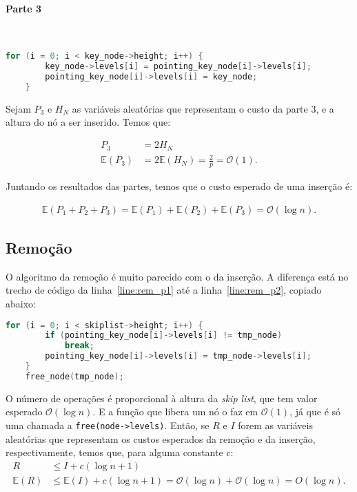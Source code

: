 \documentclass[paper=a4, fontsize=11pt]{scrartcl} %
\numberwithin{equation}{section}
\numberwithin{figure}{section}
\numberwithin{table}{section}
\numberwithin{definition}{section}
\numberwithin{theorem}{section}
\numberwithin{property}{section}
\numberwithin{proposition}{section}
\newcommand{\cO}{\ensuremath{\mathcal{O}}}
\renewcommand{\sl}{\textit{skip list}\xspace}
\newcommand{\Exp}{\ensuremath{{\mathbb{E}}}\xspace}
\begin{document}
\paragraph{Parte 3}
\ \\

\begin{lstlisting}[caption=Inserção Parte 3., language=C]
    for (i = 0; i < key_node->height; i++) {                     
        key_node->levels[i] = pointing_key_node[i]->levels[i];
        pointing_key_node[i]->levels[i] = key_node;
    }                                                           
\end{lstlisting}

Sejam $P_3$ e $H_N$ as variáveis aleatórias que representam o custo da parte 3, e a altura do nó a ser
inserido. Temos que:

\begin{align*}
P_3 &= 2 H_N \\
\Exp(P_3) &= 2 \Exp(H_N) = \frac{2}{p} = \cO(1).
\end{align*}


Juntando os resultados das partes, temos que o custo esperado de uma inserção é:

\begin{align*}
\Exp(P_1 + P_2 + P_3) = \Exp(P_1) + \Exp(P_2) + \Exp(P_3) = \cO(\log n).
\end{align*}


\subsection{Remoção}

O algoritmo da remoção é muito parecido com o da inserção. A diferença está no trecho de código da linha~\ref{line:rem_p1}
até a linha~\ref{line:rem_p2}, copiado abaixo:
\begin{lstlisting}[caption=Parte exclusiva da Remoção, language=C]
    for (i = 0; i < skiplist->height; i++) {
        if (pointing_key_node[i]->levels[i] != tmp_node)
            break;
        pointing_key_node[i]->levels[i] = tmp_node->levels[i];
    }
    free_node(tmp_node);
\end{lstlisting}

O número de operações é proporcional à altura da \sl, que tem valor esperado $\cO(\log n)$. E a função 
que libera um nó o faz em $\cO(1)$, já que é só uma chamada a \verb|free(node->levels)|. Então, se $R$ e $I$ forem
as variáveis aleatórias que representam os custos esperados da remoção e da inserção, respectivamente, temos que,
para alguma constante $c$:
\begin{align*}
R &\leq I + c( \log n + 1) \\
\Exp(R) &\leq \Exp(I) + c( \log n + 1) = \cO(\log n) + \cO(\log n) = O(\log n).
\end{align*}
\end{document}
